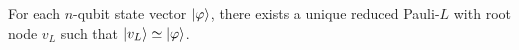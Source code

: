 \begin{lemma}
    \label{lemma:node-canonicity-strong}
    For each $n$-qubit state vector $\ket{\varphi}$, there exists a unique reduced Pauli-\limdd $L$ with root node $v_L$
    such that $\ket{v_L} \simeq \ket{\varphi}$.
%
\end{lemma}
